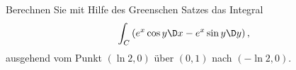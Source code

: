 \begin{atiTask}[
  title = Kurvenintegral mit Greenschen Satz
]
Berechnen Sie mit Hilfe des Greenschen Satzes das Integral
\[
\int_C \left(e^x\cos y\D x - e^x\sin y\D y\right),
\]
ausgehend vom Punkt $(\ln 2, 0)$ über $(0,1)$ nach $(-\ln 2,0)$.
\end{atiTask}
